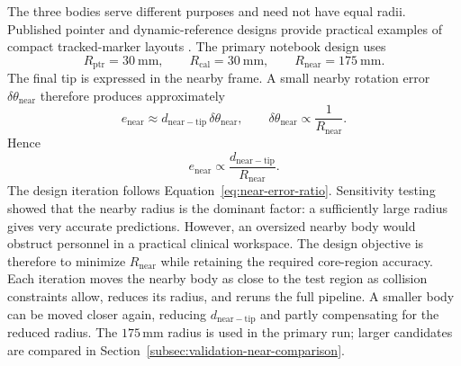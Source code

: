 \documentclass[11pt]{article}
\begin{document}
The three bodies serve different purposes and need not have equal radii.
Published pointer and dynamic-reference designs provide practical examples of
compact tracked-marker layouts \cite{pointerReview,openDRF}.  The primary
notebook design uses
\begin{equation}
\boxed{
R_{\mathrm{ptr}}=30\ \mathrm{mm},\qquad
R_{\mathrm{cal}}=30\ \mathrm{mm},\qquad
R_{\mathrm{near}}=175\ \mathrm{mm}.}
\label{eq:selected-marker-radii}
\end{equation}
The final tip is expressed in the nearby frame.  A small nearby rotation error
$\delta\theta_{\mathrm{near}}$ therefore produces approximately
\begin{equation}
e_{\mathrm{near}}
\approx d_{\mathrm{near-tip}}\,\delta\theta_{\mathrm{near}},
\qquad
\delta\theta_{\mathrm{near}}\propto\frac{1}{R_{\mathrm{near}}}.
\end{equation}
Hence
\begin{equation}
\boxed{e_{\mathrm{near}}\propto
\frac{d_{\mathrm{near-tip}}}{R_{\mathrm{near}}}.}
\label{eq:near-error-ratio}
\end{equation}
The design iteration follows Equation~\ref{eq:near-error-ratio}.  Sensitivity
testing showed that the nearby radius is the dominant factor: a sufficiently
large radius gives very accurate predictions.  However, an oversized nearby
body would obstruct personnel in a practical clinical workspace.  The design
objective is therefore to minimize $R_{\mathrm{near}}$ while retaining the
required core-region accuracy.  Each iteration moves the nearby body as close
to the test region as collision constraints allow, reduces its radius, and
reruns the full pipeline.  A smaller body can be moved closer again, reducing
$d_{\mathrm{near-tip}}$ and partly compensating for the reduced radius.  The
$175\,\mathrm{mm}$ radius is used in the primary run; larger candidates are
compared in Section~\ref{subsec:validation-near-comparison}.
\end{document}
